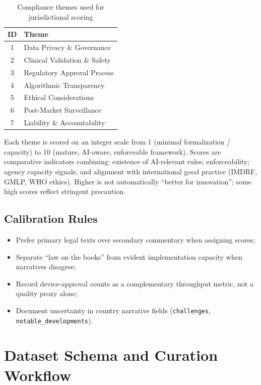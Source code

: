\begin{table}[htbp]
\centering
\caption{Compliance themes used for jurisdictional scoring}
\label{tab:themes}
\begin{tabularx}{\textwidth}{@{}c X@{}}
\toprule
\textbf{ID} & \textbf{Theme} \\
\midrule
    1 & Data Privacy \& Governance \\
    2 & Clinical Validation \& Safety \\
    3 & Regulatory Approval Process \\
    4 & Algorithmic Transparency \\
    5 & Ethical Considerations \\
    6 & Post-Market Surveillance \\
    7 & Liability \& Accountability \\
\bottomrule
\end{tabularx}
\end{table}

Each theme is scored on an integer scale from 1 (minimal formalization / capacity) to 10 (mature, AI-aware, enforceable framework). Scores are comparative indicators combining: existence of AI-relevant rules; enforceability; agency capacity signals; and alignment with international good practice (IMDRF, GMLP, WHO ethics). Higher is not automatically ``better for innovation''; some high scores reflect stringent precaution.

\subsection{Calibration Rules}

\begin{itemize}[noitemsep]
  \item Prefer primary legal texts over secondary commentary when assigning scores;
  \item Separate ``law on the books'' from evident implementation capacity when narratives disagree;
  \item Record device-approval counts as a complementary throughput metric, not a quality proxy alone;
  \item Document uncertainty in country narrative fields (\texttt{challenges}, \texttt{notable\_developments}).
\end{itemize}

\section{Dataset Schema and Curation Workflow}
\label{sec:schema}

